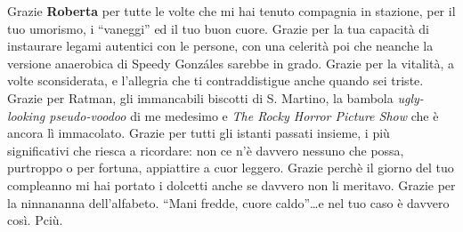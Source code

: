 \documentclass[10pt]{amsart}
\newcommand{\n}[1]{{\Large \bf #1}}
\begin{document}
Grazie \n{Roberta} per tutte le volte che mi hai tenuto compagnia in stazione, per il tuo umorismo, i ``vaneggi'' ed il tuo buon cuore. Grazie per la tua capacità di instaurare legami autentici con le persone, con una celerità poi che neanche la versione anaerobica di Speedy Gonz\'ales sarebbe in grado. Grazie per la vitalità, a volte sconsiderata, e l'allegria che ti contraddistigue anche quando sei triste. Grazie per Ratman, gli immancabili biscotti di S. Martino, la bambola \emph{ugly-looking pseudo-voodoo} di me medesimo e \emph{The Rocky Horror Picture Show} che è ancora lì immacolato. Grazie per tutti gli istanti passati insieme, i più significativi che riesca a ricordare: non ce n'è davvero nessuno che possa, purtroppo o per fortuna, appiattire  a cuor leggero. Grazie perchè il giorno del tuo compleanno mi hai portato i dolcetti anche se davvero non li meritavo.  Grazie per la ninnananna dell'alfabeto. ``Mani fredde, cuore caldo''\ldots e nel tuo caso è davvero così. Pciù.\\
 
\end{document}
